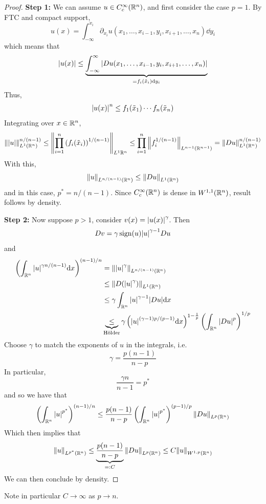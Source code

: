 \documentclass{article}
\begin{document}
\begin{proof}
    \textbf{Step 1:} We can assume \(u \in C_c^\infty(\mathbb{R}^n)\), and first consider the case \(p = 1\). By FTC and compact support,
    \[u(x) = \int_{-\infty}^{x_i}\partial_{x_i}u(x_1, \dots, x_{i-1}, y_i, x_{i+1}, \dots, x_n)\dd y_i\]
    which means that
    \[\abs{u(x)} \le \underbrace{\int_{-\infty}^\infty \abs{Du(x_1, \dots, x_{i-1}, y_i, x_{i+1}, \dots, x_n)}}_{=f_i(\tilde x_i)\dd y_i}\]
    Thus,
    \[\abs{u(x)}^n \le f_1(\tilde x_1)\cdots f_n(\tilde x_n)\]
    Integrating over \(x \in \mathbb{R}^n\),
    \[\norm{\abs{u}}^{n/(n-1)}_{L^1(\mathbb{R}^n)} \le \norm{\prod_{i=1}^n \left(f_i(\tilde x_i)\right)^{1/(n-1)}}_{L^1{\mathbb{R}^n}} \le \prod_{i=1}^n \norm{f_i^{1/(n-1)}}_{L^{n-1}(\mathbb{R}^{n-1})} = \norm{Du}_{L^1(\mathbb{R}^n)}^{n/(n-1)}\]
    With this,
    \[\norm{u}_{L^{n/(n-1)}(\mathbb{R}^n)} \le \norm{Du}_{L^1(\mathbb{R}^n)}\]
    and in this case, \(p^* = n/(n-1)\). Since \(C_c^\infty(\mathbb{R}^n)\) is dense in \(W^{1, 1}(\mathbb{R}^n)\), result follows by density.
    
    \textbf{Step 2:} Now suppose \(p > 1\), consider \(v(x) = \abs{u(x)}^\gamma\). Then
    \[Dv = \gamma \operatorname{sign}(u)\abs{u}^{\gamma - 1}Du\]
    and
    \begin{align*}
        \left(\int_{\mathbb{R}^n}\abs{u}^{\gamma n/(n-1)} \dd x\right)^{(n-1)/n} &= \norm{\abs{u}^\gamma}_{L^{n/(n-1)}(\mathbb{R}^n)} \\
        &\le \norm{D(\abs{u}^\gamma)}_{L^1(\mathbb{R}^n)} \\
        &\le \gamma\int_{\mathbb{R}^n}\abs{u}^{\gamma - 1}\abs{D u}\dd x \\
        &\underbrace{\le}_{\text{H\"older}} \gamma \left(\abs{u}^{(\gamma - 1)p/(p-1)}\dd x\right)^{1 - \frac{1}{p}}\left(\int_{\mathbb{R}^n}\abs{D u}^p\right)^{1/p}
    \end{align*}
    Choose \(\gamma\) to match the exponents of \(u\) in the integrals, i.e.
    \[\gamma = \frac{p(n-1)}{n-p}\]
    In particular,
    \[\frac{\gamma n}{n-1} = p^*\]
    and so we have that
    \begin{align*}
        \left(\int_{\mathbb{R}^n}\abs{u}^{p^*}\right)^{(n-1)/n} \le \frac{p(n-1)}{n-p}\left(\int_{\mathbb{R}^n}\abs{u}^{p^*}\right)^{(p-1)/p}\norm{Du}_{L^p(\mathbb{R}^n)}
    \end{align*}
    Which then implies that
    \[\norm{u}_{L^{p^*}(\mathbb{R}^n)} \le \underbrace{\frac{p(n-1)}{n-p}}_{=: C}\norm{Du}_{L^p(\mathbb{R}^n)} \le C\norm{u}_{W^{1, p}(\mathbb{R}^n)}\]
    We can then conclude by density.
\end{proof}

Note in particular \(C \to \infty\) as \(p \to n\).
\end{document}

